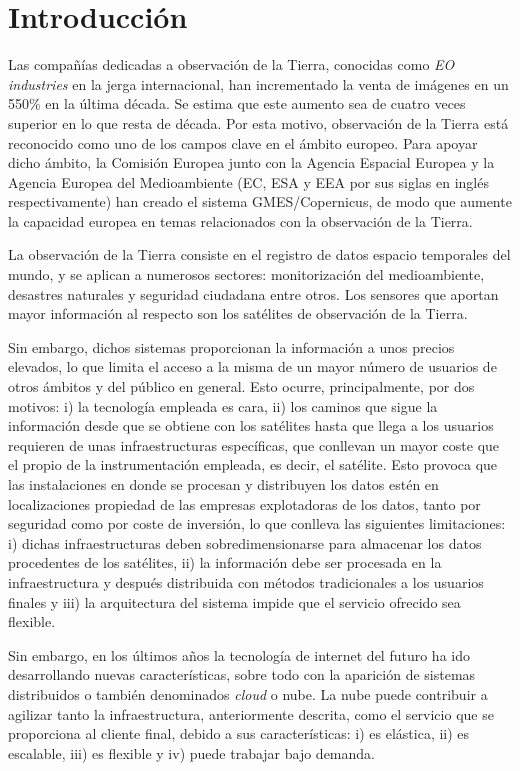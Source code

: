 \section{Introducción}
\label{sec:intro}

Las compañías dedicadas a observación de la Tierra, conocidas como \emph{EO industries} en la jerga internacional, han incrementado la venta de imágenes en un 550\% en la última década. Se estima que este aumento sea de cuatro veces superior en lo que resta de década. Por esta motivo, observación de la Tierra está reconocido como uno de los campos clave en el ámbito europeo. Para apoyar dicho ámbito, la Comisión Europea junto con la Agencia Espacial Europea y la Agencia Europea del Medioambiente (EC, ESA y EEA por sus siglas en inglés respectivamente) han creado el sistema GMES/Copernicus, de modo que aumente la capacidad europea en temas relacionados con la observación de la Tierra.

La observación de la Tierra consiste en el registro de datos espacio temporales del mundo, y se aplican a numerosos sectores: monitorización del medioambiente, desastres naturales y seguridad ciudadana entre otros. Los sensores que aportan mayor información al respecto son los satélites de observación de la Tierra.

Sin embargo, dichos sistemas proporcionan la información a unos precios elevados, lo que limita el acceso a la misma de un mayor número de usuarios de otros ámbitos y del público en general. Esto ocurre, principalmente, por dos motivos: i) la tecnología empleada es cara, ii) los caminos que sigue la información desde que se obtiene con los satélites hasta que llega a los usuarios requieren de unas infraestructuras específicas, que conllevan un mayor coste que el propio de la instrumentación empleada, es decir, el satélite. Esto provoca que las instalaciones en donde se procesan y distribuyen los datos estén en localizaciones propiedad de las empresas explotadoras de los datos, tanto por seguridad como por coste de inversión, lo que conlleva las siguientes limitaciones: i) dichas infraestructuras deben sobredimensionarse para almacenar los datos procedentes de los satélites, ii) la información debe ser procesada en la infraestructura y después distribuida con métodos tradicionales a los usuarios finales y iii) la arquitectura del sistema impide que el servicio ofrecido sea flexible.

Sin embargo, en los últimos años la tecnología de internet del futuro ha ido desarrollando nuevas características, sobre todo con la aparición de sistemas distribuidos o también denominados \emph{cloud} o nube. La nube puede contribuir a agilizar tanto la infraestructura, anteriormente descrita, como el servicio que se proporciona al cliente final, debido a sus características: i) es elástica, ii) es escalable, iii) es flexible y iv) puede trabajar bajo demanda.

